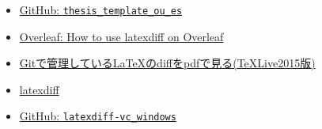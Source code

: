\begin{tcolorbox}[title={第~\ref{ch:check}~章の参考文献}, colback=yellow!5!white, colframe=yellow!75!black, coltitle=black]
    \begin{itemize}
        \item \href{https://github.com/ryo-ARAKI/thesis_template_ou_es}{GitHub: \texttt{thesis\_template\_ou\_es}}
        \item \href{https://www.overleaf.com/learn/latex/Articles/How_to_use_latexdiff_on_Overleaf}{Overleaf: How to use latexdiff on Overleaf}
        \item \href{https://nekketsuuu.github.io/entries/2017/01/27/latexdiff-vc.html}{Gitで管理しているLaTeXのdiffをpdfで見る(TeXLive2015版)}
        \item \href{https://abenori.blogspot.com/2016/06/latexdiff.html}{latexdiff}
        \item \href{https://github.com/Yuki-MATSUKAWA/latexdiff-vc_windows}{GitHub: \texttt{latexdiff-vc\_windows}}
    \end{itemize}
\end{tcolorbox}


